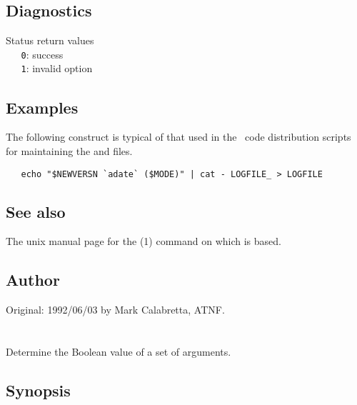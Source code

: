 \subsection*{Diagnostics}

Status return values
\\ \verb+   0+: success
\\ \verb+   1+: invalid option

\subsection*{Examples}

The following construct is typical of that used in the \aipspp\ code
distribution scripts for maintaining the  and 
files.

\begin{verbatim}
   echo "$NEWVERSN `adate` ($MODE)" | cat - LOGFILE_ > LOGFILE
\end{verbatim}

\subsection*{See also}

The unix manual page for the (1) command on which  is
based.

\subsection*{Author}

Original: 1992/06/03 by Mark Calabretta, ATNF.


\newpage
\section{}
\label{affirm}

Determine the Boolean value of a set of arguments.

\subsection*{Synopsis}

\begin{synopsis}
\end{synopsis}

